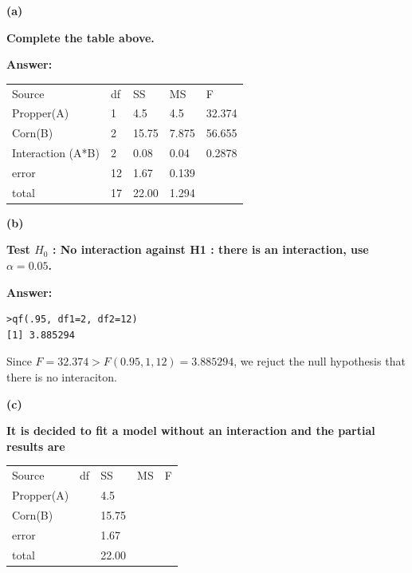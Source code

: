 \documentclass[letterpaper,11pt]{article}
\begin{document}
  \bigbreak

  \begin{addmargin}[-1.1em]{0em}
  \textbf{(a)}\par\end{addmargin}
    \textbf{Complete the table above.}\par
  \bigbreak
  \begin{addmargin}[-0.5em]{0em}
  \textbf{Answer: }\end{addmargin}

  \begin{center}
  \begin{tabular}{ p{5cm}p{1cm}p{1.5cm}p{1.5cm}p{1.5cm}}
  \centering Source & df & SS & MS & F\\
  \centering Propper(A) & 1 & 4.5 & 4.5 & 32.374\\
  \centering Corn(B) & 2 & 15.75 & 7.875 & 56.655\\
  \centering Interaction (A*B) & 2 & 0.08 & 0.04 & 0.2878\\
  \centering error & 12 & 1.67 & 0.139 & {}\\
  \centering total & 17 & 22.00 & 1.294 & {}\\
  \end{tabular}
  \end{center}


  \bigbreak
  \begin{addmargin}[-1.1em]{0em}
  \textbf{(b)}\par\end{addmargin}
    \textbf{Test $H_0$ : No interaction against H1 : there is an interaction, use $\alpha = 0.05$.}\par
  \bigbreak
  \begin{addmargin}[-0.5em]{0em}
  \textbf{Answer: }\end{addmargin}


\begin{lstlisting}
>qf(.95, df1=2, df2=12)
[1] 3.885294
\end{lstlisting}
Since $F = 32.374 > F(0.95,1,12) = 3.885294$, we rejuct the null hypothesis that there is no interaciton.

  \bigbreak
  \begin{addmargin}[-1.1em]{0em}
  \textbf{(c)}\par\end{addmargin}
    \textbf{It is decided to fit a model without an interaction and the partial results are}\par

    \begin{center}
    \begin{tabular}{ p{5cm}p{1cm}p{1cm}p{1cm}p{1cm}}
    \centering Source & df & SS & MS & F\\
    \centering Propper(A) & {} & 4.5 & {} &\\
    \centering Corn(B) & {} & 15.75 & {} & {}\\
    \centering error & {} & 1.67 & {} & {}\\
    \centering total & {} & 22.00 & {} & {}\\
    \end{tabular}
    \end{center}
\end{document}

